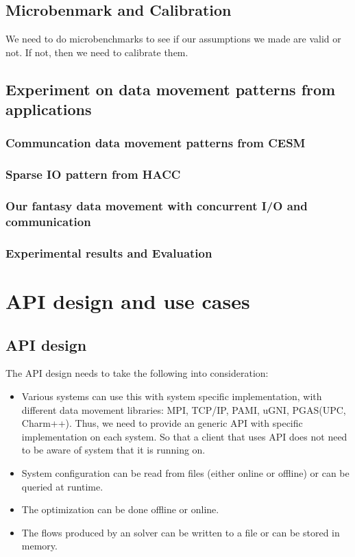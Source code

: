 \documentclass[letter]{article}
\begin{document}
\subsection{Microbenmark and Calibration}

We need to do microbenchmarks to see if our assumptions we made are valid or not. If not, then we need to calibrate them.

\subsection{Experiment on data movement patterns from applications}
\subsubsection{Communcation data movement patterns from CESM}
\subsubsection{Sparse IO pattern from HACC}
\subsubsection{Our fantasy data movement with concurrent I/O and communication}

\subsubsection{Experimental results and Evaluation}

\section{API design and use cases}
\subsection{API design}
The API design needs to take the following into consideration:

\begin{itemize}
	\item Various systems can use this with system specific implementation, with different data movement libraries: MPI, TCP/IP, PAMI, uGNI, PGAS(UPC, Charm++). Thus, we need to provide an generic API with specific implementation on each system. So that a client that uses API does not need to be aware of system that it is running on.
	\item System configuration can be read from files (either online or offline) or can be queried at runtime.
	\item The optimization can be done offline or online.
	\item The flows produced by an solver can be written to a file or can be stored in memory.
\end{itemize}
\end{document}
